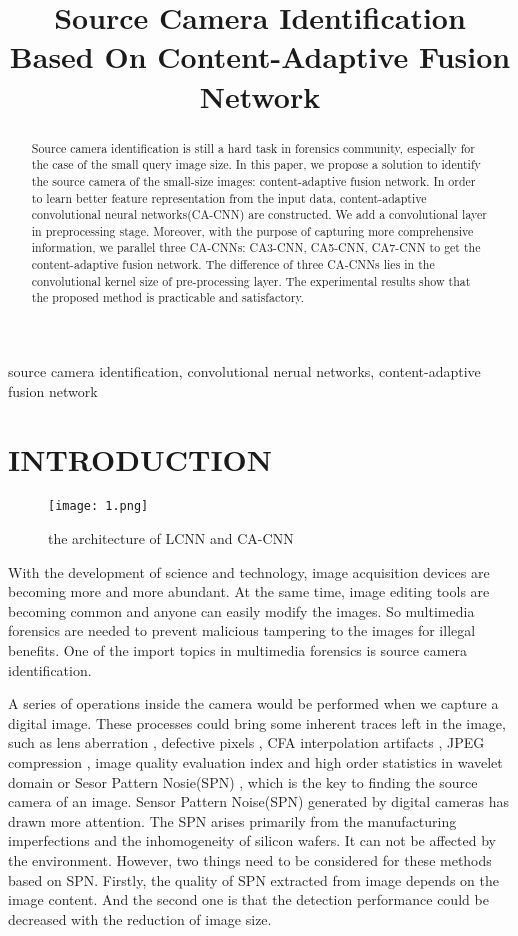 \documentclass{article}
\title{Source Camera Identification Based On Content-Adaptive Fusion Network}
\begin{document}
\maketitle
\begin{abstract}
Source camera identification is still a hard task in forensics community, especially for the case of the small query image size. In this paper, we propose a solution to identify the source camera of the small-size images: content-adaptive fusion network. In order to learn better feature representation from the input data, content-adaptive convolutional neural networks(CA-CNN) are constructed. We add a convolutional layer in preprocessing stage. Moreover, with the purpose of capturing more comprehensive information, we parallel three CA-CNNs: CA3-CNN, CA5-CNN, CA7-CNN to get the content-adaptive fusion network. The difference of three CA-CNNs lies in the convolutional kernel size of pre-processing layer. The experimental results show that the proposed method is practicable and satisfactory.
\end{abstract}
\begin{keywords}
source camera identification, convolutional nerual networks, content-adaptive fusion network
\end{keywords}
\section{INTRODUCTION}
\label{sec:intro}
\begin{figure*}[!tp]
	\centering
	\texttt{[image: 1.png]}
	\caption{the architecture of LCNN and CA-CNN}
\end{figure*}

With the development of science and technology, image acquisition devices are becoming more and more abundant. At the same time, image editing tools are becoming common and anyone can easily modify the images. So multimedia forensics are needed to prevent malicious tampering to the images for illegal benefits. One of the import topics in multimedia forensics is source camera identification.  

A series of operations inside the camera would be performed when we capture a digital image. These processes could bring some inherent traces left in the image, such as lens aberration \cite{1,2}, defective pixels \cite{3,4}, CFA interpolation artifacts \cite{5}, JPEG compression \cite{6,7}, image quality evaluation index and high order statistics in wavelet domain \cite{8,9} or Sesor Pattern Nosie(SPN) \cite{10,11,12,13,14,15}, which is the key to finding the source camera of an image. Sensor Pattern Noise(SPN) generated by digital cameras has drawn more attention. The SPN arises primarily from the manufacturing imperfections and the inhomogeneity of silicon wafers. It can not be affected by the environment. However, two things need to be considered for these methods based on SPN. Firstly, the quality of SPN extracted from image depends on the image content. And the second one is that the detection performance could be decreased with the reduction of image size. 
\end{document}
